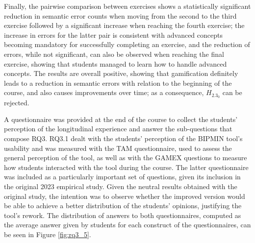 Finally, the pairwise comparison between exercises shows a statistically significant reduction in semantic error counts when moving from the second to the third exercise followed by a significant increase when reaching the fourth exercise; the increase in errors for the latter pair is consistent with advanced concepts becoming mandatory for successfully completing an exercise, and the reduction of errors, while not significant, can also be observed when reaching the final exercise, showing that students managed to learn how to handle advanced concepts. The results are overall positive, showing that gamification definitely leads to a reduction in semantic errors with relation to the beginning of the course, and also causes improvements over time; as a consequence, ${H_{2.3_{0}}}$ can be rejected.


A questionnaire was provided at the end of the course to collect the students' perception of the longitudinal experience and answer the sub-questions that compose RQ3. RQ3.1 dealt with the students' perception of the BIPMIN tool's usability and was measured with the TAM questionnaire, used to assess the general perception of the tool, as well as with the GAMEX questions to measure how students interacted with the tool during the course. The latter questionnaire was included as a particularly important set of questions, given its inclusion in the original 2023 empirical study. Given the neutral results obtained with the original study, the intention was to observe whether the improved version would be able to achieve a better distribution of the students' opinions, justifying the tool's rework. The distribution of answers to both questionnaires, computed as the average answer given by students for each construct of the questionnaires, can be seen in Figure \ref{fig:rq3_5}.

